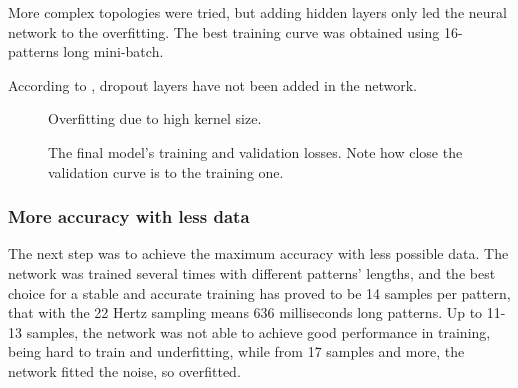 More complex topologies were tried, but adding hidden layers only led the neural network to the overfitting. The best training curve was obtained using 16-patterns long mini-batch.

According to \cite{Hin12}, dropout layers have not been added in the network.

\begin{center}
	\begin{figure}[ht!]
		\caption{Overfitting due to high kernel size.}
	\end{figure}
\end{center}

\begin{center}
	\begin{figure}[ht!]
		\caption{The final model's training and validation losses. Note how close the validation curve is to the training one.}
	\end{figure}
\end{center}

\subsubsection{More accuracy with less data}
The next step was to achieve the maximum accuracy with less possible data. The network was trained several times with different patterns' lengths, and the best choice for a stable and accurate training has proved to be 14 samples per pattern, that with the 22 Hertz sampling means 636 milliseconds long patterns. Up to 11-13 samples, the network was not able to achieve good performance in training, being hard to train and underfitting, while from 17 samples and more, the network fitted the noise, so overfitted.

